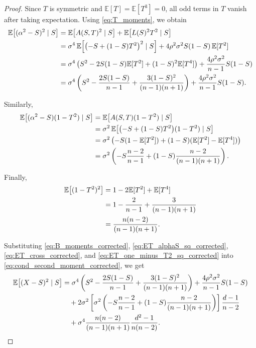 \documentclass{article}
\begin{document}
\begin{proof}
Since $T$ is symmetric and $\mathbb E[T]=\mathbb E[T^3]=0$, all odd terms in $T$ vanish after taking expectation.
Using \eqref{eq:T_moments}, we obtain
\begin{align}
\mathbb E\big[(\alpha^2-S)^2\mid S\big]
&=
\mathbb E\big[A(S,T)^2\mid S\big]
+
\mathbb E\big[L(S)^2T^2\mid S\big]
\notag\\
&=
\sigma^4\,
\mathbb E\!\left[\bigl(-S+(1-S)T^2\bigr)^2\mid S\right]
+
4\rho^2\sigma^2 S(1-S)\,\mathbb E[T^2]
\notag\\
&=
\sigma^4\left(
S^2
-2S(1-S)\mathbb E[T^2]
+(1-S)^2\mathbb E[T^4]
\right)
+
\frac{4\rho^2\sigma^2}{n-1}S(1-S)
\notag\\
&=
\sigma^4\left(
S^2
-\frac{2S(1-S)}{n-1}
+\frac{3(1-S)^2}{(n-1)(n+1)}
\right)
+
\frac{4\rho^2\sigma^2}{n-1}S(1-S).
\label{eq:ET_alphaS_sq_corrected}
\end{align}

Similarly,
\begin{align}
\mathbb E\big[(\alpha^2-S)(1-T^2)\mid S\big]
&=
\mathbb E\big[A(S,T)(1-T^2)\mid S\big]
\notag\\
&=
\sigma^2\,\mathbb E\!\left[\bigl(-S+(1-S)T^2\bigr)(1-T^2)\mid S\right]
\notag\\
&=
\sigma^2\left(
-S(1-\mathbb E[T^2])+(1-S)(\mathbb E[T^2]-\mathbb E[T^4])
\right)
\notag\\
&=
\sigma^2\left(
-S\frac{n-2}{n-1}
+
(1-S)\frac{n-2}{(n-1)(n+1)}
\right).
\label{eq:ET_cross_corrected}
\end{align}

Finally,
\begin{align}
\mathbb E\big[(1-T^2)^2\big]
&=
1-2\mathbb E[T^2]+\mathbb E[T^4]
\notag\\
&=
1-\frac{2}{n-1}+\frac{3}{(n-1)(n+1)}
\notag\\
&=
\frac{n(n-2)}{(n-1)(n+1)}.
\label{eq:ET_one_minus_T2_sq_corrected}
\end{align}

Substituting \eqref{eq:B_moments_corrected}, \eqref{eq:ET_alphaS_sq_corrected}, \eqref{eq:ET_cross_corrected}, and \eqref{eq:ET_one_minus_T2_sq_corrected} into \eqref{eq:cond_second_moment_corrected}, we get
\begin{align}
\mathbb E\big[(X-S)^2\mid S\big]
&=
\sigma^4\left(
S^2
-\frac{2S(1-S)}{n-1}
+\frac{3(1-S)^2}{(n-1)(n+1)}
\right)
+
\frac{4\rho^2\sigma^2}{n-1}S(1-S)
\notag\\
&\quad
+
2\sigma^2
\left[
\sigma^2\left(
-S\frac{n-2}{n-1}
+
(1-S)\frac{n-2}{(n-1)(n+1)}
\right)
\right]
\frac{d-1}{n-2}
\notag\\
&\quad
+
\sigma^4\frac{n(n-2)}{(n-1)(n+1)}\frac{d^2-1}{n(n-2)}.
\label{eq:after_substitution_corrected}
\end{align}


\end{proof}
\end{document}
